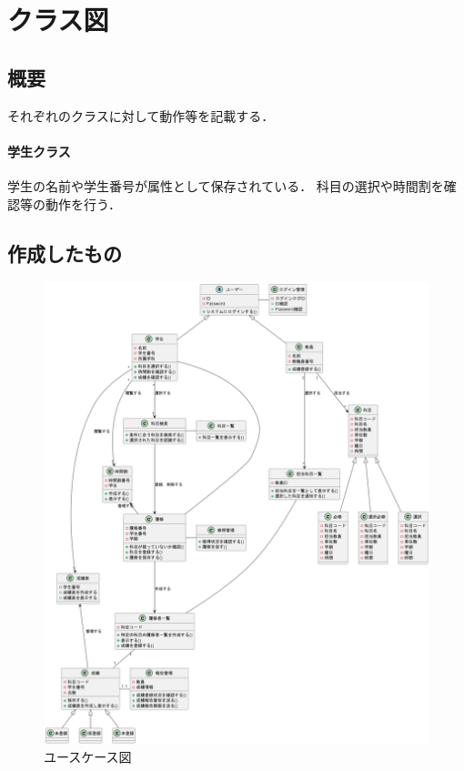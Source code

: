 \documentclass[documentclass]{jsarticle}
\begin{document}
\section{クラス図}
\subsection*{概要}
それぞれのクラスに対して動作等を記載する．
\paragraph*{学生クラス}
学生の名前や学生番号が属性として保存されている．
科目の選択や時間割を確認等の動作を行う．

\subsection*{作成したもの}

\begin{figure}[H]
  \begin{center}
    \includegraphics*[scale=0.4]{figure/5-1.png}
  \end{center}
  \caption{ユースケース図}
  \label{fig:5-1}
\end{figure}
\end{document}
